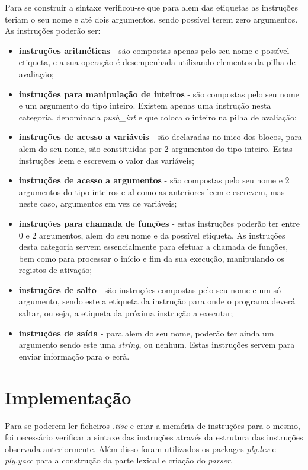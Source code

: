 \documentclass[titlepage,11pt,svgnames]{article}   %
\begin{document}
Para se construir a sintaxe verificou-se que para alem das etiquetas as instruções teriam o seu nome e até dois argumentos, sendo possível terem zero argumentos. As instruções poderão ser:
\begin{itemize}
\item \textbf{instruções aritméticas} - são compostas apenas pelo seu nome e possível etiqueta, e a sua operação é desempenhada utilizando elementos da pilha de avaliação;
\item \textbf{instruções para manipulação de inteiros} - são compostas pelo seu nome e um argumento do tipo inteiro. Existem apenas uma instrução nesta categoria, denominada \textit{push\_int} e que coloca o inteiro na pilha de avaliação;
\item \textbf{instruções de acesso a variáveis} - são declaradas no inico dos blocos, para alem do seu nome, são constituídas por 2 argumentos do tipo inteiro. Estas instruções leem e escrevem o valor das variáveis;
\item \textbf{instruções de acesso a argumentos} - são compostas pelo seu nome e 2 argumentos do tipo inteiros e al como as anteriores leem e escrevem, mas neste caso, argumentos em vez de variáveis;
\item \textbf{instruções para chamada de funções} - estas instruções poderão ter entre 0 e 2 argumentos, alem do seu nome e da possível etiqueta. As instruções desta categoria servem essencialmente para efetuar a chamada de funções, bem como para processar o início e fim da sua execução, manipulando os registos de ativação;
\item \textbf{instruções de salto} - são instruções compostas pelo seu nome e um só argumento, sendo este a etiqueta da instrução para onde o programa deverá saltar, ou seja, a etiqueta da próxima instrução a executar;
\item \textbf{instruções de saída} - para alem do seu nome, poderão ter ainda um argumento sendo este uma \textit{string}, ou nenhum. Estas instruções servem para enviar informação para o ecrã.
\end{itemize}

\pagebreak


\section{Implementação}

Para se poderem ler ficheiros \textit{.tisc} e criar a memória de instruções para o mesmo, foi necessário verificar a sintaxe das instruções através da estrutura das instruções observada anteriormente. Além disso foram utilizados os packages \textit{ply.lex} e \textit{ply.yacc} para a construção da parte lexical e criação do \textit{parser}.
\end{document}
